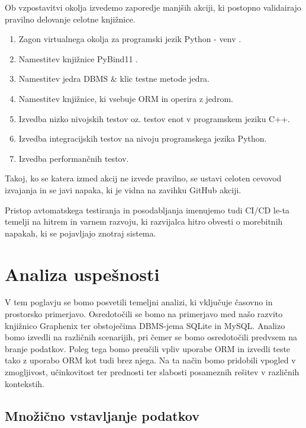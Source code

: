 \documentclass[a4paper,12pt,openright]{book}
\begin{document}
   Ob vzpostavitvi okolja izvedemo zaporedje manjših akciji, ki postopno validairajo pravilno delovanje celotne knjižnice.
   \begin{enumerate}
       \item Zagon virtualnega okolja za programski jezik Python - venv \cite{PY_VENV_DOCS}.
       \item Namestitev knjižnice PyBind11 \cite{PYBIND11_GITHUB}.
       \item Namestitev jedra DBMS \& klic testne metode jedra.
       \item Namestitev knjižnice, ki vsebuje ORM in operira z jedrom.
       \item Izvedba nizko nivojskih testov oz. testov enot v programskem jeziku C++.
       \item Izvedba integracijskih testov na nivoju programskega jezika Python.
       \item Izvedba performančnih testov.
   \end{enumerate}

    \noindent
   Takoj, ko se katera izmed akcij ne izvede pravilno, se ustavi celoten cevovod izvajanja in se javi napaka, ki je vidna na zavihku GitHub akciji.

   Pristop avtomatskega testiranja in posodabljanja imenujemo tudi CI/CD le-ta temelji na hitrem in varnem razvoju, ki razvijalca hitro obvesti o morebitnih napakah, ki se pojavljajo znotraj sistema.
    
\chapter{Analiza uspešnosti}
\label{ch2}

    V tem poglavju se bomo posvetili temeljni analizi, ki vključuje časovno in prostorsko primerjavo. Osredotočili se bomo na primerjavo med našo razvito knjižnico Graphenix ter obstoječima DBMS-jema SQLite in MySQL. Analizo bomo izvedli na različnih scenarijih, pri čemer se bomo osredotočili predvsem na branje podatkov. Poleg tega bomo preučili vpliv uporabe ORM in izvedli teste tako z uporabo ORM kot tudi brez njega. Na ta način bomo pridobili vpogled v zmogljivost, učinkovitost ter prednosti ter slabosti posameznih rešitev v različnih kontekstih.

    \newpage
   \section{Množično vstavljanje podatkov}
\end{document}
